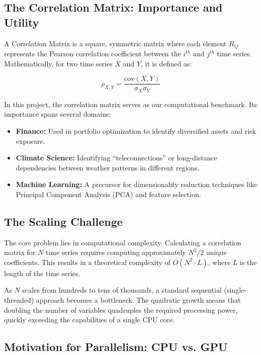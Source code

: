 \subsection{The Correlation Matrix: Importance and Utility}

A Correlation Matrix is a square, symmetric matrix where each element $R_{ij}$ represents the Pearson correlation coefficient between the $i^{th}$ and $j^{th}$ time series. Mathematically, for two time series $X$ and $Y$, it is defined as:

\begin{equation}
\rho_{X,Y} = \frac{\text{cov}(X,Y)}{\sigma_X \sigma_Y}
\end{equation}

In this project, the correlation matrix serves as our computational benchmark. Its importance spans several domains:

\begin{itemize}
    \item \textbf{Finance:} Used in portfolio optimization to identify diversified assets and risk exposure.
    \item \textbf{Climate Science:} Identifying ``teleconnections'' or long-distance dependencies between weather patterns in different regions.
    \item \textbf{Machine Learning:} A precursor for dimensionality reduction techniques like Principal Component Analysis (PCA) and feature selection.
\end{itemize}

\subsection{The Scaling Challenge}

The core problem lies in computational complexity. Calculating a correlation matrix for $N$ time series requires computing approximately $N^2/2$ unique coefficients. This results in a theoretical complexity of $O(N^2 \cdot L)$, where $L$ is the length of the time series.

As $N$ scales from hundreds to tens of thousands, a standard sequential (single-threaded) approach becomes a bottleneck. The quadratic growth means that doubling the number of variables quadruples the required processing power, quickly exceeding the capabilities of a single CPU core.

\subsection{Motivation for Parallelism: CPU vs. GPU}

